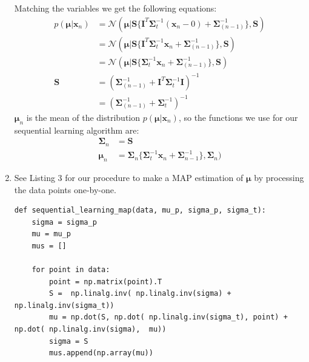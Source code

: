 \documentclass[a4paper,10pt]{article}
\numberwithin{equation}{section} %
\numberwithin{figure}{section} %
\numberwithin{table}{section} %
\theoremstyle{mytheor}
\begin{document}
\begin{enumerate}
		Matching the variables we get the following equations:
		\begin{align}
			p(\boldsymbol{\mu} | \boldsymbol{x}_n) &= \mathcal{N}(\boldsymbol{\mu} | \boldsymbol S \{ \boldsymbol{I}^T \boldsymbol{\Sigma}_t^{-1}(\boldsymbol{x}_n - 0) + \boldsymbol{\Sigma}_{(n-1)}^{-1}\}, \boldsymbol S)\\
			&= \mathcal{N}(\boldsymbol{\mu} | \boldsymbol S \{ \boldsymbol{I}^T \boldsymbol{\Sigma}_t^{-1} \boldsymbol{x}_n + \boldsymbol{\Sigma}_{(n-1)}^{-1}\}, \boldsymbol S)\\
			 &= \mathcal{N}(\boldsymbol{\mu} | \boldsymbol S \{ \boldsymbol{\Sigma}_t^{-1} \boldsymbol{x}_n + \boldsymbol{\Sigma}_{(n-1)}^{-1}\}, \boldsymbol S)\\
			\boldsymbol{S} &= (\boldsymbol{\Sigma}_{(n-1)}^{-1} + \boldsymbol{I}^T \boldsymbol{\Sigma}_t^{-1} \boldsymbol{I})^{-1}\\
			&= (\boldsymbol{\Sigma}_{(n-1)}^{-1} + \boldsymbol{\Sigma}_t^{-1})^{-1}
		\end{align}
		$\boldsymbol \mu_n$ is the mean of the distribution $p(\boldsymbol \mu | \boldsymbol x_n)$, so the functions we use for our sequential learning algorithm are:
		\begin{align}
			\boldsymbol \Sigma_n &= \boldsymbol S\\
			\boldsymbol \mu_n &= \boldsymbol \Sigma_n \{ \boldsymbol \Sigma_t^{-1} \boldsymbol x_n + \boldsymbol{\Sigma}_{n-1}^{-1}\}, \boldsymbol \Sigma_n)
		\end{align}
	\item See Listing 3 for our procedure to make a MAP estimation of $\boldsymbol \mu$ by processing the data points one-by-one. \\
	\begin{lstlisting}[label={list:first},caption=Python code for function \textit{sequential\_learning\_map(data, mu\_p, sigma\_p, sigma\_t)}.]
def sequential_learning_map(data, mu_p, sigma_p, sigma_t):
    sigma = sigma_p
    mu = mu_p
    mus = []

    for point in data:
        point = np.matrix(point).T
        S =  np.linalg.inv( np.linalg.inv(sigma) + np.linalg.inv(sigma_t))
        mu = np.dot(S, np.dot( np.linalg.inv(sigma_t), point) + np.dot( np.linalg.inv(sigma),  mu))
        sigma = S
        mus.append(np.array(mu))


\end{lstlisting}
\end{enumerate}
\end{document}
